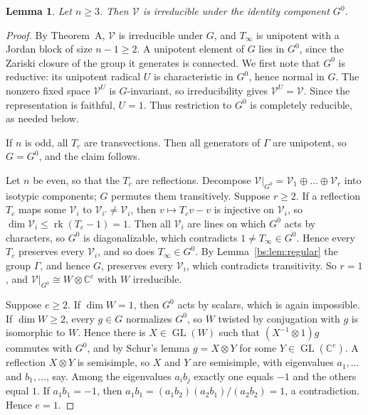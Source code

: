 \documentclass[11pt,a4paper]{article}
\newtheorem{lemma}[theorem]{Lemma}
\theoremstyle{definition}
\theoremstyle{remark}
\numberwithin{equation}{section}
\newcommand{\C}{\mathbb{C}}
\DeclareMathOperator{\rk}{rk}
\DeclareMathOperator{\GL}{GL}
\begin{document}
\begin{lemma}\label{bs:lem:lie}
Let $n\ge3$. Then $\mathcal V$ is irreducible under the identity component $G^0$.
\end{lemma}

\begin{proof}
By Theorem~A, $\mathcal V$ is irreducible under $G$, and $T_\infty$ is unipotent with a Jordan block of size $n-1\ge2$. A unipotent element of $G$ lies in $G^0$, since the Zariski closure of the group it generates is connected. We first note that $G^0$ is reductive: its unipotent radical $U$ is characteristic in $G^0$, hence normal in $G$. The nonzero fixed space $\mathcal V^U$ is $G$-invariant, so irreducibility gives $\mathcal V^U=\mathcal V$. Since the representation is faithful, $U=1$. Thus restriction to $G^0$ is completely reducible, as needed below.

If $n$ is odd, all $T_c$ are transvections. Then all generators of $\Gamma$ are unipotent, so $G=G^0$, and the claim follows.

Let $n$ be even, so that the $T_c$ are reflections. Decompose $\mathcal V|_{G^0}=\mathcal V_1\oplus\dots\oplus\mathcal V_r$ into isotypic components; $G$ permutes them transitively. Suppose $r\ge2$. If a reflection $T_c$ maps some $\mathcal V_i$ to $\mathcal V_{i'}\ne\mathcal V_i$, then $v\mapsto T_cv-v$ is injective on $\mathcal V_i$, so $\dim\mathcal V_i\le\rk(T_c-1)=1$. Then all $\mathcal V_i$ are lines on which $G^0$ acts by characters, so $G^0$ is diagonalizable, which contradicts $1\ne T_\infty\in G^0$. Hence every $T_c$ preserves every $\mathcal V_i$, and so does $T_\infty\in G^0$. By Lemma~\ref{bs:lem:regular} the group $\Gamma$, and hence $G$, preserves every $\mathcal V_i$, which contradicts transitivity. So $r=1$, and $\mathcal V|_{G^0}\cong W\otimes\C^e$ with $W$ irreducible.

Suppose $e\ge2$. If $\dim W=1$, then $G^0$ acts by scalars, which is again impossible. If $\dim W\ge2$, every $g\in G$ normalizes $G^0$, so $W$ twisted by conjugation with $g$ is isomorphic to $W$. Hence there is $X\in\GL(W)$ such that $(X^{-1}\otimes1)g$ commutes with $G^0$, and by Schur's lemma $g=X\otimes Y$ for some $Y\in\GL(\C^e)$. A reflection $X\otimes Y$ is semisimple, so $X$ and $Y$ are semisimple, with eigenvalues $a_1,\dots$ and $b_1,\dots$, say. Among the eigenvalues $a_ib_j$ exactly one equals $-1$ and the others equal $1$. If $a_1b_1=-1$, then $a_1b_1=(a_1b_2)(a_2b_1)/(a_2b_2)=1$, a contradiction. Hence $e=1$.
\end{proof}
\end{document}
